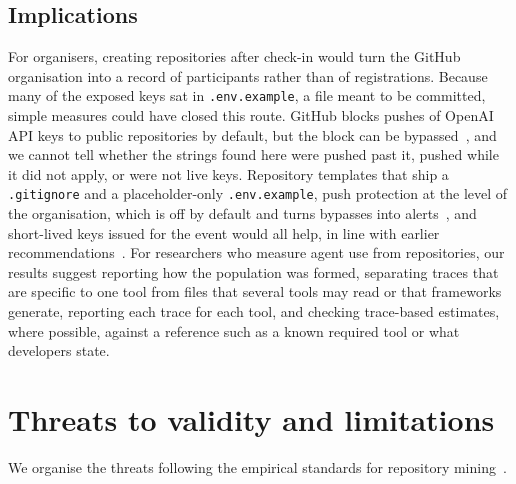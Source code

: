 \documentclass{article}
\begin{document}
\subsection{Implications}
For organisers, creating repositories after check-in would turn the GitHub organisation into a record of participants rather than of registrations. Because many of the exposed keys sat in \texttt{.env.example}, a file meant to be committed, simple measures could have closed this route. GitHub blocks pushes of OpenAI API keys to public repositories by default, but the block can be bypassed~\cite{github2026pushprotection,github2026patterns}, and we cannot tell whether the strings found here were pushed past it, pushed while it did not apply, or were not live keys. Repository templates that ship a \texttt{.gitignore} and a placeholder-only \texttt{.env.example}, push protection at the level of the organisation, which is off by default and turns bypasses into alerts~\cite{github2026pushprotection}, and short-lived keys issued for the event would all help, in line with earlier recommendations~\cite{meli2019git,krause2022pushed}. For researchers who measure agent use from repositories, our results suggest reporting how the population was formed, separating traces that are specific to one tool from files that several tools may read or that frameworks generate, reporting each trace for each tool, and checking trace-based estimates, where possible, against a reference such as a known required tool or what developers state.

\section{Threats to validity and limitations}\label{sec:threats}

We organise the threats following the empirical standards for repository mining~\cite{ralph2020standards}.
\end{document}
